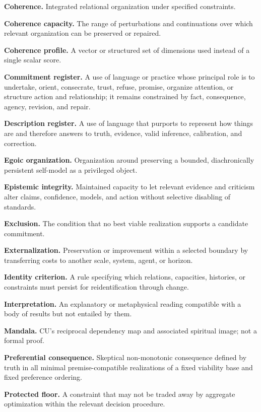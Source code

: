 \documentclass[
  11pt,
]{article}
\begin{document}
\textbf{Coherence.} Integrated relational organization under specified
constraints.

\textbf{Coherence capacity.} The range of perturbations and
continuations over which relevant organization can be preserved or
repaired.

\textbf{Coherence profile.} A vector or structured set of dimensions
used instead of a single scalar score.

\textbf{Commitment register.} A use of language or practice whose
principal role is to undertake, orient, consecrate, trust, refuse,
promise, organize attention, or structure action and relationship; it
remains constrained by fact, consequence, agency, revision, and repair.

\textbf{Description register.} A use of language that purports to
represent how things are and therefore answers to truth, evidence, valid
inference, calibration, and correction.

\textbf{Egoic organization.} Organization around preserving a bounded,
diachronically persistent self-model as a privileged object.

\textbf{Epistemic integrity.} Maintained capacity to let relevant
evidence and criticism alter claims, confidence, models, and action
without selective disabling of standards.

\textbf{Exclusion.} The condition that no best viable realization
supports a candidate commitment.

\textbf{Externalization.} Preservation or improvement within a selected
boundary by transferring costs to another scale, system, agent, or
horizon.

\textbf{Identity criterion.} A rule specifying which relations,
capacities, histories, or constraints must persist for reidentification
through change.

\textbf{Interpretation.} An explanatory or metaphysical reading
compatible with a body of results but not entailed by them.

\textbf{Mandala.} CU's reciprocal dependency map and associated
spiritual image; not a formal proof.

\textbf{Preferential consequence.} Skeptical non-monotonic consequence
defined by truth in all minimal premise-compatible realizations of a
fixed viability base and fixed preference ordering.

\textbf{Protected floor.} A constraint that may not be traded away by
aggregate optimization within the relevant decision procedure.
\end{document}
